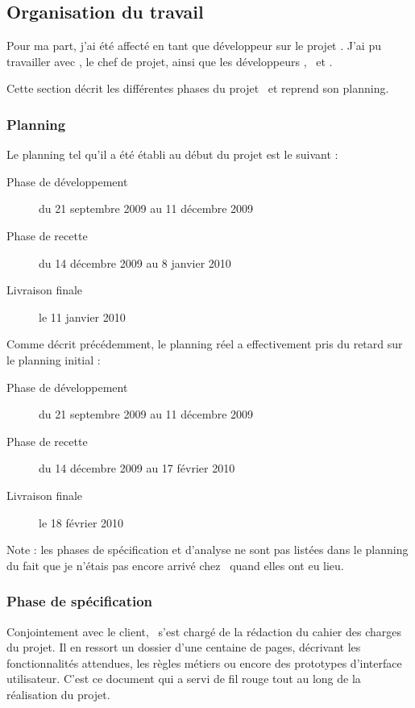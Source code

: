 \subsection{Organisation du travail}
\label{section:eyrolles_organisation}

Pour ma part, j'ai été affecté en tant que développeur sur le projet \aey. J'ai pu travailler avec \acohen, le chef de projet, ainsi que les développeurs \ahamon, \aweistroff\ et \abachelet. 

Cette section décrit les différentes phases du projet \aey\ et reprend son planning.


\subsubsection{Planning}

Le planning tel qu'il a été établi au début du projet est le suivant :

\begin{description}
	\item[Phase de développement] du 21 septembre 2009 au 11 décembre 2009
	\item[Phase de recette] du 14 décembre 2009 au 8 janvier 2010
	\item[Livraison finale] le 11 janvier 2010
\end{description}

Comme décrit précédemment, le planning réel a effectivement pris du retard sur le planning initial :

\begin{description}
	\item[Phase de développement] du 21 septembre 2009 au 11 décembre 2009
	\item[Phase de recette] du 14 décembre 2009 au 17 février 2010
	\item[Livraison finale] le 18 février 2010
\end{description}

Note : les phases de spécification et d'analyse ne sont pas listées dans le planning du fait que je n'étais pas encore arrivé chez \asl\ quand elles ont eu lieu.


\subsubsection{Phase de spécification}

Conjointement avec le client, \acohen\ s'est chargé de la rédaction du cahier des charges du projet. Il en ressort un dossier d'une centaine de pages, décrivant les fonctionnalités attendues, les règles métiers ou encore des prototypes d'interface utilisateur. C'est ce document qui a servi de fil rouge tout au long de la réalisation du projet.


